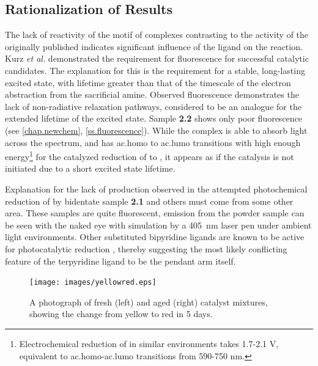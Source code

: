 \subsection{Rationalization of Results}\label{ss.rationalization}

The lack of reactivity of the  motif of complexes contrasting to the activity of the originally published  indicates significant influence of the ligand on the reaction. Kurz \textit{et al.} demonstrated the requirement for fluorescence for successful catalytic candidates\autocite{kurz2006}. The explanation for this is the requirement for a stable, long-lasting excited state, with lifetime greater than that of the timescale of the electron abstraction from the sacrificial amine. Observed fluorescence demonstrates the lack of non-radiative relaxation pathways, considered to be an analogue for the extended lifetime of the excited state. Sample \textbf{2.2} shows only poor fluorescence (see \autoref{chap.newchem}, \autoref{ss.fluorescence}). While the complex is able to absorb light across the spectrum, and has \gls{ac.homo} to \gls{ac.lumo} transitions with high enough energy\footnote{Electrochemical reduction of  in similar environments takes 1.7-2.1 V, equivalent to \gls{ac.homo}-\gls{ac.lumo} transitions from 590-750 nm\autocite{grills2014}.} for the catalyzed reduction of  to , it appears as if the catalysis is not initiated due to a short excited state lifetime.

Explanation for the lack of  production observed in the attempted photochemical reduction of  by bidentate sample \textbf{2.1} and others must come from some other area. These samples are quite fluorescent, emission from the powder sample can be seen with the naked eye with simulation by a 405~nm laser pen under ambient light environments. Other substituted bipyridine ligands are known to be active for photocatalytic reduction \autocite{hawecker1986, kurz2006}, thereby suggesting the most likely conflicting feature of the terpyridine ligand to be the pendant arm itself.

\begin{figure}[!htbp]
 \begin{center}
  \texttt{[image: images/yellowred.eps]}
 \end{center}
 \caption[A photograph of aged and fresh catalytic mixture.]{A photograph of fresh (left) and aged (right) catalyst mixtures, showing the change from yellow to red in 5 days.}
 \label{fig.yellowred}
\end{figure}

